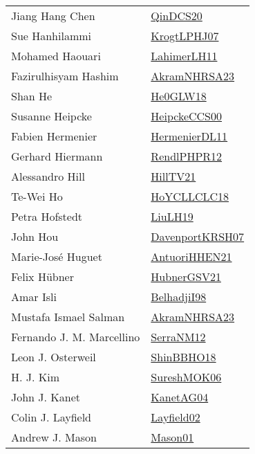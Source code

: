 {\begin{longtable}{p{4cm}p{20cm}}
Jiang Hang Chen & \href{articles/QinDCS20.pdf}{QinDCS20}\cite{QinDCS20} \\
Sue Hanhilammi & \href{papers/KrogtLPHJ07.pdf}{KrogtLPHJ07}\cite{KrogtLPHJ07} \\
Mohamed Haouari & \href{papers/LahimerLH11.pdf}{LahimerLH11}\cite{LahimerLH11} \\
Fazirulhisyam Hashim & \href{articles/AkramNHRSA23.pdf}{AkramNHRSA23}\cite{AkramNHRSA23} \\
Shan He & \href{papers/He0GLW18.pdf}{He0GLW18}\cite{He0GLW18} \\
Susanne Heipcke & \href{articles/HeipckeCCS00.pdf}{HeipckeCCS00}\cite{HeipckeCCS00} \\
Fabien Hermenier & \href{papers/HermenierDL11.pdf}{HermenierDL11}\cite{HermenierDL11} \\
Gerhard Hiermann & \href{papers/RendlPHPR12.pdf}{RendlPHPR12}\cite{RendlPHPR12} \\
Alessandro Hill & \href{papers/HillTV21.pdf}{HillTV21}\cite{HillTV21} \\
Te{-}Wei Ho & \href{papers/HoYCLLCLC18.pdf}{HoYCLLCLC18}\cite{HoYCLLCLC18} \\
Petra Hofstedt & \href{papers/LiuLH19.pdf}{LiuLH19}\cite{LiuLH19} \\
John Hou & \href{papers/DavenportKRSH07.pdf}{DavenportKRSH07}\cite{DavenportKRSH07} \\
Marie{-}Jos{\'{e}} Huguet & \href{papers/AntuoriHHEN21.pdf}{AntuoriHHEN21}\cite{AntuoriHHEN21} \\
Felix H{\"{u}}bner & \href{articles/HubnerGSV21.pdf}{HubnerGSV21}\cite{HubnerGSV21} \\
Amar Isli & \href{articles/BelhadjiI98.pdf}{BelhadjiI98}\cite{BelhadjiI98} \\
Mustafa Ismael Salman & \href{articles/AkramNHRSA23.pdf}{AkramNHRSA23}\cite{AkramNHRSA23} \\
Fernando J. M. Marcellino & \href{papers/SerraNM12.pdf}{SerraNM12}\cite{SerraNM12} \\
Leon J. Osterweil & \href{articles/ShinBBHO18.pdf}{ShinBBHO18}\cite{ShinBBHO18} \\
H. J. Kim & \href{}{SureshMOK06}\cite{SureshMOK06} \\
John J. Kanet & \href{}{KanetAG04}\cite{KanetAG04} \\
Colin J. Layfield & \href{}{Layfield02}\cite{Layfield02} \\
Andrew J. Mason & \href{articles/Mason01.pdf}{Mason01}\cite{Mason01} \\

\end{longtable}}
